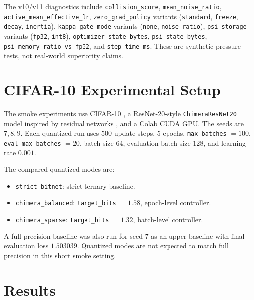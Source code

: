 \documentclass[11pt]{article}
\begin{document}
The v10/v11 diagnostics include \texttt{collision\_score}, \texttt{mean\_noise\_ratio}, \texttt{active\_mean\_effective\_lr}, \texttt{zero\_grad\_policy} variants (\texttt{standard}, \texttt{freeze}, \texttt{decay}, \texttt{inertia}), \texttt{kappa\_gate\_mode} variants (\texttt{none}, \texttt{noise\_ratio}), \texttt{psi\_storage} variants (\texttt{fp32}, \texttt{int8}), \texttt{optimizer\_state\_bytes}, \texttt{psi\_state\_bytes}, \texttt{psi\_memory\_ratio\_vs\_fp32}, and \texttt{step\_time\_ms}. These are synthetic pressure tests, not real-world superiority claims.

\section{CIFAR-10 Experimental Setup}

The smoke experiments use CIFAR-10 \cite{krizhevsky2009cifar}, a ResNet-20-style \texttt{ChimeraResNet20} model inspired by residual networks \cite{he2016resnet}, and a Colab CUDA GPU. The seeds are $7,8,9$. Each quantized run uses $500$ update steps, $5$ epochs, \texttt{max\_batches} $=100$, \texttt{eval\_max\_batches} $=20$, batch size $64$, evaluation batch size $128$, and learning rate $0.001$.

The compared quantized modes are:
\begin{itemize}
    \item \texttt{strict\_bitnet}: strict ternary baseline.
    \item \texttt{chimera\_balanced}: \texttt{target\_bits} $=1.58$, epoch-level controller.
    \item \texttt{chimera\_sparse}: \texttt{target\_bits} $=1.32$, batch-level controller.
\end{itemize}
A full-precision baseline was also run for seed $7$ as an upper baseline with final evaluation loss $1.503039$. Quantized modes are not expected to match full precision in this short smoke setting.

\section{Results}
\end{document}
